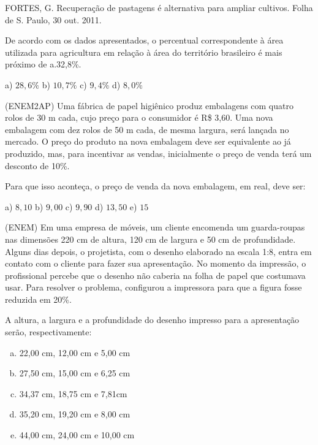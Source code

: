 \begin{multicols*}{2}
	FORTES, G. Recuperação de pastagens é alternativa para ampliar cultivos. Folha de S. Paulo, 30 out. 2011.

	De acordo com os dados apresentados, o percentual correspondente à área utilizada para agricultura em relação à área do território brasileiro é mais próximo de a.32,8\%.

	a) $28,6\% $ b) $10,7\% $ c) $ 9,4\% $ d) $ 8,0\% $

	\execnum (ENEM2AP) Uma fábrica de papel higiênico produz embalagens com quatro rolos de 30 m cada, cujo preço
	para o consumidor é R\$ 3,60. Uma nova embalagem com dez rolos de 50 m cada, de mesma largura, será lançada no
	mercado. O preço do produto na nova embalagem deve ser equivalente ao já produzido, mas, para incentivar as
	vendas, inicialmente o preço de venda terá um desconto de 10\%.

	Para que isso aconteça, o preço de venda da nova embalagem, em real, deve ser:

	a) $8,10 $ b) $9,00 $ c) $9,90 $ d) $13,50 $ e) $15 $

	\execnum (ENEM) Em uma empresa de móveis, um cliente encomenda um guarda-roupas nas dimensões 220 cm de
	altura, 120 cm de largura e 50 cm de profundidade. Alguns dias depois, o projetista, com o desenho elaborado na
	escala 1:8, entra em contato com o cliente para fazer sua apresentação. No momento da impressão, o profissional
	percebe que o desenho não caberia na folha de papel que costumava usar. Para resolver o problema, configurou a
	impressora para que a figura fosse reduzida em 20\%.

	A altura, a largura e a profundidade do desenho impresso para a apresentação serão, respectivamente:
	\begin{enumerate}[(a)]
		\item 22,00 cm, 12,00 cm e 5,00 cm
		\item 27,50 cm, 15,00 cm e 6,25 cm
		\item 34,37 cm, 18,75 cm e 7,81cm
		\item 35,20 cm, 19,20 cm e 8,00 cm
		\item 44,00 cm, 24,00 cm e 10,00 cm
	\end{enumerate}


\end{multicols*}
